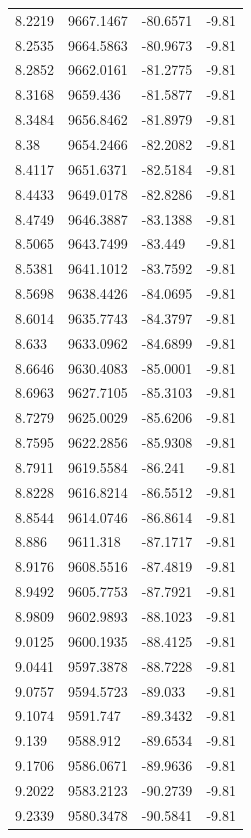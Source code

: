 \begin{table}[H]
\begin{tabular}{llll}
8.2219 & 9667.1467 & -80.6571 & -9.81 \\
8.2535 & 9664.5863 & -80.9673 & -9.81 \\
8.2852 & 9662.0161 & -81.2775 & -9.81 \\
8.3168 & 9659.436 & -81.5877 & -9.81 \\
8.3484 & 9656.8462 & -81.8979 & -9.81 \\
8.38 & 9654.2466 & -82.2082 & -9.81 \\
8.4117 & 9651.6371 & -82.5184 & -9.81 \\
8.4433 & 9649.0178 & -82.8286 & -9.81 \\
8.4749 & 9646.3887 & -83.1388 & -9.81 \\
8.5065 & 9643.7499 & -83.449 & -9.81 \\
8.5381 & 9641.1012 & -83.7592 & -9.81 \\
8.5698 & 9638.4426 & -84.0695 & -9.81 \\
8.6014 & 9635.7743 & -84.3797 & -9.81 \\
8.633 & 9633.0962 & -84.6899 & -9.81 \\
8.6646 & 9630.4083 & -85.0001 & -9.81 \\
8.6963 & 9627.7105 & -85.3103 & -9.81 \\
8.7279 & 9625.0029 & -85.6206 & -9.81 \\
8.7595 & 9622.2856 & -85.9308 & -9.81 \\
8.7911 & 9619.5584 & -86.241 & -9.81 \\
8.8228 & 9616.8214 & -86.5512 & -9.81 \\
8.8544 & 9614.0746 & -86.8614 & -9.81 \\
8.886 & 9611.318 & -87.1717 & -9.81 \\
8.9176 & 9608.5516 & -87.4819 & -9.81 \\
8.9492 & 9605.7753 & -87.7921 & -9.81 \\
8.9809 & 9602.9893 & -88.1023 & -9.81 \\
9.0125 & 9600.1935 & -88.4125 & -9.81 \\
9.0441 & 9597.3878 & -88.7228 & -9.81 \\
9.0757 & 9594.5723 & -89.033 & -9.81 \\
9.1074 & 9591.747 & -89.3432 & -9.81 \\
9.139 & 9588.912 & -89.6534 & -9.81 \\
9.1706 & 9586.0671 & -89.9636 & -9.81 \\
9.2022 & 9583.2123 & -90.2739 & -9.81 \\
9.2339 & 9580.3478 & -90.5841 & -9.81 \\

\end{tabular}
\end{table}
